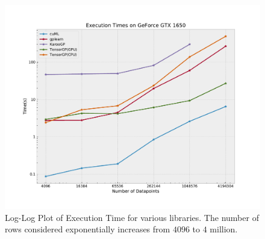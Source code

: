 \begin{figure}[ht]
  \centering
  \includegraphics[scale=0.55]{images/ExecutionTimes.pdf}
  \caption{Log-Log Plot of Execution Time for various libraries. The number of rows considered exponentially increases from $4096$ to $4$ million.}
  \label{fig:exectimes}
\end{figure}

